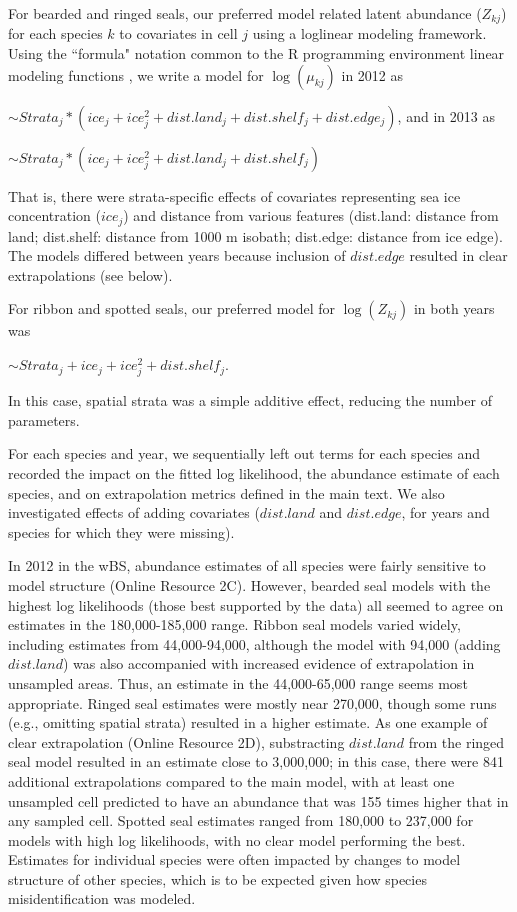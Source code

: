 \documentclass{svjour3}
\begin{document}
For bearded and ringed seals, our preferred model related latent abundance ($Z_{kj}$) for each species $k$ to covariates in cell $j$ using a loglinear modeling framework.  Using the ``formula" notation common to the R programming environment linear modeling functions \citep[e.g., lm, glm;][]{RTeam2017}, we write a model for $\log(\mu_{kj})$ in 2012 as

$\sim Strata_j * (ice_j + ice_j^2 + dist.land_j + dist.shelf_j + dist.edge_j)$, and in 2013 as

$\sim Strata_j * (ice_j + ice_j^2 + dist.land_j + dist.shelf_j)$

That is, there were strata-specific effects of covariates representing sea ice concentration ($ice_j$) and distance from various features (dist.land: distance from land; dist.shelf: distance from 1000 m isobath; dist.edge: distance from ice edge).  The models differed between years because inclusion of $dist.edge$ resulted in clear extrapolations (see below).

For ribbon and spotted seals, our preferred model for $\log(Z_{kj})$ in both years was

$\sim Strata_j + ice_j + ice_j^2 + dist.shelf_j$.

In this case, spatial strata was a simple additive effect, reducing the number of parameters.

For each species and year, we sequentially left out terms for each species and recorded the impact on the fitted log likelihood, the abundance estimate of each species, and on extrapolation metrics defined in the main text.  We also investigated effects of adding covariates ($dist.land$ and $dist.edge$, for years and species for which they were missing).

In 2012 in the wBS, abundance estimates of all species were fairly sensitive to model structure (Online Resource 2C).  However, bearded seal models with the highest log likelihoods (those best supported by the data) all seemed to agree on estimates in the 180,000-185,000 range.  Ribbon seal models varied widely, including estimates from 44,000-94,000, although the model with 94,000 (adding $dist.land$) was also accompanied with increased evidence of extrapolation in unsampled areas.  Thus, an estimate in the 44,000-65,000 range seems most appropriate.  Ringed seal estimates were mostly near 270,000, though some runs (e.g., omitting spatial strata) resulted in a higher estimate.  As one example of clear extrapolation (Online Resource 2D), substracting $dist.land$ from the ringed seal model resulted in an estimate close to 3,000,000; in this case, there were 841 additional extrapolations compared to the main model, with at least one unsampled cell predicted to have an abundance that was 155 times higher that in any sampled cell.  Spotted seal estimates ranged from 180,000 to 237,000 for models with high log likelihoods, with no clear model performing the best.  Estimates for individual species were often impacted by changes to model structure of other species, which is to be expected given how species misidentification was modeled.
\end{document}
